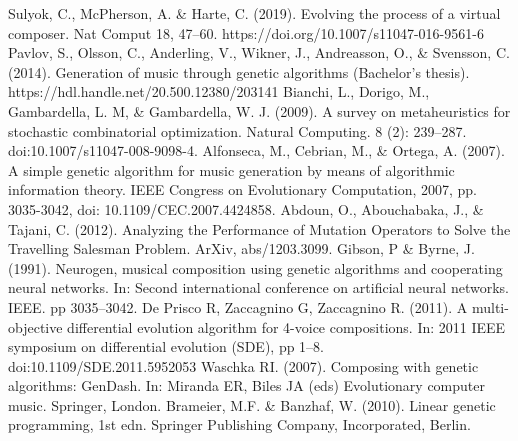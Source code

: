 \documentclass[conference]{IEEEtran}
\begin{document}
\begin{thebibliography}{9}
Sulyok, C., McPherson, A. \& Harte, C. (2019). Evolving the process of a virtual composer. Nat Comput 18, 47–60. https://doi.org/10.1007/s11047-016-9561-6
Pavlov, S., Olsson, C., Anderling, V., Wikner, J., Andreasson, O., \& Svensson, C. (2014). Generation of music through genetic algorithms (Bachelor's thesis). https://hdl.handle.net/20.500.12380/203141
Bianchi, L., Dorigo, M., Gambardella, L. M, \& Gambardella, W. J. (2009). A survey on metaheuristics for stochastic combinatorial optimization. Natural Computing. 8 (2): 239–287. doi:10.1007/s11047-008-9098-4.
Alfonseca, M., Cebrian, M., \& Ortega, A. (2007). A simple genetic algorithm for music generation by means of algorithmic information theory. IEEE Congress on Evolutionary Computation, 2007, pp. 3035-3042, doi: 10.1109/CEC.2007.4424858.
Abdoun, O., Abouchabaka, J., \& Tajani, C. (2012). Analyzing the Performance of Mutation Operators to Solve the Travelling Salesman Problem. ArXiv, abs/1203.3099.
Gibson, P \& Byrne, J. (1991). Neurogen, musical composition using genetic algorithms and cooperating neural networks. In: Second international conference on artificial neural networks. IEEE. pp 3035–3042.
De Prisco R, Zaccagnino G, Zaccagnino R. (2011). A multi-objective differential evolution algorithm for 4-voice compositions. In: 2011 IEEE symposium on differential evolution (SDE), pp 1–8. doi:10.1109/SDE.2011.5952053
Waschka RI. (2007). Composing with genetic algorithms: GenDash. In: Miranda ER, Biles JA (eds) Evolutionary computer music. Springer, London.
Brameier, M.F. \& Banzhaf, W. (2010). Linear genetic programming, 1st edn. Springer Publishing Company, Incorporated, Berlin.

\end{thebibliography}


\newpage
\end{document}
